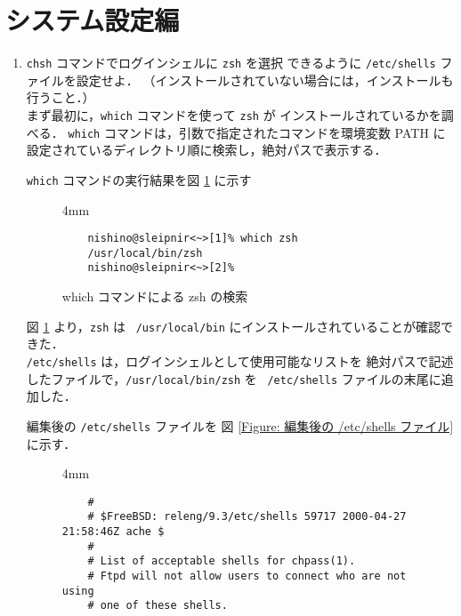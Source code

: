 \documentclass[a4j]{jreport}
\begin{document}
\section{システム設定編}
\begin{enumerate}[labelindent=\parindent, leftmargin=*, label=課題 \arabic*）]
  \item \texttt{chsh} コマンドでログインシェルに \texttt{zsh} を選択
	できるように \texttt{/etc/shells} ファイルを設定せよ．
	（インストールされていない場合には，インストールも行うこと．）\\

	まず最初に，\texttt{which} コマンドを使って \texttt{zsh} が
	インストールされているかを調べる．
	\texttt{which} コマンドは，引数で指定されたコマンドを環境変数 PATH
	に設定されているディレクトリ順に検索し，絶対パスで表示する．

	\texttt{which} コマンドの実行結果を図 \ref{Figure: which zsh} に示す

	  \begin{figure}[H]
	    \centering
              \begin{screen}[3]
                \setlength{\baselineskip} {4mm}
	        \begin{verbatim}
	nishino@sleipnir<~>[1]% which zsh
	/usr/local/bin/zsh
	nishino@sleipnir<~>[2]%
	        \end{verbatim}
	        \vspace*{-18pt}
	      \end{screen}
	      \caption{which コマンドによる zsh の検索}
	      \label{Figure: which zsh}
	  \end{figure}

	図 \ref{Figure: which zsh} より，\texttt{zsh} は~
	\texttt{/usr/local/bin} にインストールされていることが確認できた．\\

	\texttt{/etc/shells} は，ログインシェルとして使用可能なリストを
	絶対パスで記述したファイルで，\texttt{/usr/local/bin/zsh} を~
	\texttt{/etc/shells} ファイルの末尾に追加した．

	編集後の \texttt{/etc/shells} ファイルを
	図 \ref{Figure: 編集後の /etc/shells ファイル} に示す．

	\begin{figure}[H]
	  \centering
	    \begin{framed}
	      \setlength{\baselineskip} {4mm}
	      \begin{verbatim}
	#
	# $FreeBSD: releng/9.3/etc/shells 59717 2000-04-27 21:58:46Z ache $
	#
	# List of acceptable shells for chpass(1).
	# Ftpd will not allow users to connect who are not using
	# one of these shells.


\end{verbatim}
\end{framed}
\end{figure}
\end{enumerate}
\end{document}
